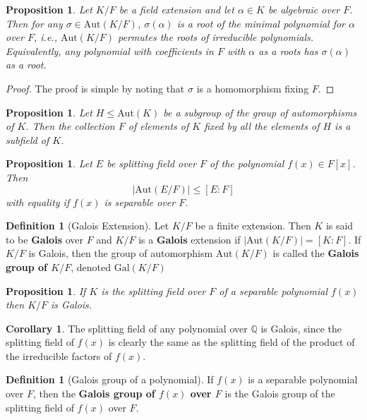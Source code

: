 \documentclass[10pt, oneside, reqno]{amsart}
\theoremstyle{plain}%
\newtheorem{prop}[thm]{Proposition}
\theoremstyle{definition}
\newtheorem{defn}[thm]{Definition}
\newtheorem{cor}[thm]{Corollary}
\theoremstyle{remark}
\newcommand{\al}{\alpha}
\newcommand{\Q}{\mathbb{Q}}
\newcommand{\aut}[1]{\text{Aut}{(#1)}}
\newcommand{\xdeg}[2]{[#1 : #2]}
\newcommand{\gal}[2]{\text{Gal}(#1/#2)}
\begin{document}
\begin{prop}
    Let $K/F$ be a field extension and let $\al \in K$ be algebraic over $F$.  Then for any $\sigma \in \aut{K/F}$,  $\sigma (\al)$ is a root of the minimal polynomial for $\al$ over $F$, i.e., $\aut{K/F}$ permutes the roots of irreducible polynomials.  Equivalently, any polynomial with coefficients in $F$ with $\al$ as a roots has $\sigma(\alpha)$ as a root.
\end{prop}
\begin{proof}
    The proof is simple by noting that $\sigma$ is a homomorphism fixing $F$.
\end{proof}

\begin{prop}
    Let $H \leq \text{Aut}(K)$ be a subgroup of the group of automorphisms of $K$.  Then the collection $F$ of elements of $K$ fixed by all the elements of $H$ is a subfield of $K$.
\end{prop}

\begin{prop}
    Let $E$ be splitting field over $F$ of the polynomial $f(x) \in F[x]$.  Then \[
        |\aut{E/F}| \leq \xdeg{E}{F}
    \] with equality if $f(x)$ is separable over $F$.
\end{prop}

\begin{defn}[Galois Extension]
    Let $K/F$ be a finite extension.  Then $K$ is said to be \textbf{Galois} over $F$ and $K/F$ is a \textbf{Galois} extension if $|\aut{K/F}| = \xdeg{K}{F}$.  If $K/F$ is Galois, then the group of automorphism $\aut{K/F}$ is called the \textbf{Galois group of $K/F$}, denoted $\gal{K}{F}$
\end{defn}

\begin{prop}
    If $K$ is the splitting field over $F$ of a separable polynomial $f(x)$ then $K/F$ is Galois.
\end{prop}

\begin{cor}
    The splitting field of any polynomial over $\Q$ is Galois, since the splitting field of $f(x)$ is clearly the same as the splitting field of the product of the irreducible factors of $f(x)$.
\end{cor}

\begin{defn}[Galois group of a polynomial]
    If $f(x)$ is a separable polynomial over $F$, then the \textbf{Galois group of $f(x)$ over $F$} is the Galois group of the splitting field of $f(x)$ over $F$.
\end{defn}
\end{document}
